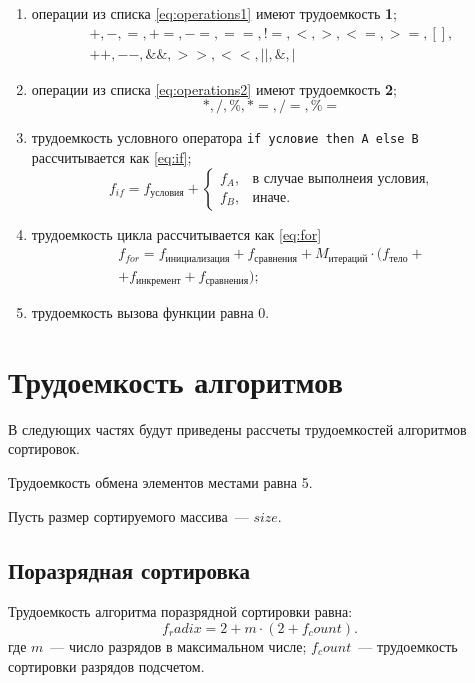 \begin{enumerate}
	\item операции из списка \ref{eq:operations1} имеют трудоемкость \textbf{1};
	\begin{equation}
		\label{eq:operations1}
		\begin{gathered}
			+, -, =, +=, -=, ==, !=, <, >, <=, >=, [], \\ ++, --, \&\&, >>, <<, ||, \&, |
		\end{gathered}
	\end{equation}
	\item операции из списка \ref{eq:operations2} имеют трудоемкость \textbf{2};
	\begin{equation}
		\label{eq:operations2}
		*, /, \%, *=, /=, \%=
	\end{equation}
	\item трудоемкость условного оператора \texttt{if условие then A else B} рассчитывается как \ref{eq:if};
	\begin{equation}
		\label{eq:if}
		f_{if} = f_{\text{условия}} + 
		\begin{cases}
			f_{A}, & \text{в случае выполнеия условия,}\\
			f_{B}, & \text{иначе}.
		\end{cases}
	\end{equation}
	\item трудоемкость цикла рассчитывается как \ref{eq:for}
	\begin{equation}
		\label{eq:for}
		\begin{gathered}
			f_{for} = f_{\text{инициализация}} + f_{\text{сравнения}} + M_{\text{итераций}} \cdot (f_{\text{тело}} +\\
			+ f_{\text{инкремент}} + f_{\text{сравнения}});
		\end{gathered}
	\end{equation}
	\item трудоемкость вызова функции равна 0.
\end{enumerate}

\section{Трудоемкость алгоритмов}
В следующих частях будут приведены рассчеты трудоемкостей алгоритмов сортировок.

Трудоемкость обмена элементов местами равна 5.

Пусть размер сортируемого массива~--- $size$.

\subsection*{Поразрядная сортировка}
Трудоемкость алгоритма поразрядной сортировки равна:
\begin{equation}
	f_radix = 2 + m \cdot (2 + f_count).
\end{equation}
где $m$~--- число разрядов в максимальном числе;
$f_count$~--- трудоемкость сортировки разрядов подсчетом.

